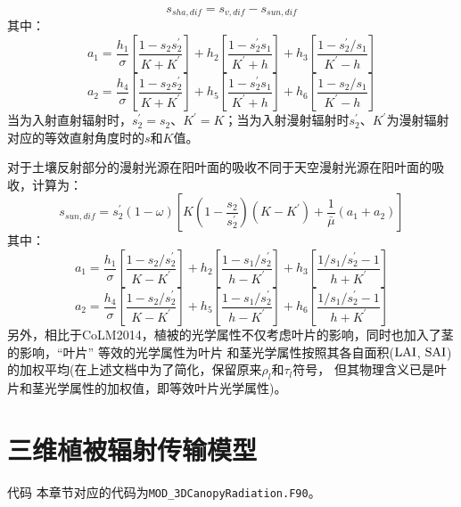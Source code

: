 \begin{equation}
s_{sha,dif}=s_{v,dif}-s_{sun,dif}
\end{equation}
其中：
\begin{equation}
a_{1}=\frac{h_{1}}{\sigma}\left[\frac{1-s_{2} s_{2}^{\prime}}{K+K^{\prime}}\right]+h_{2}\left[\frac{1-s_{2}^{\prime} 
s_{1}}{K^{\prime}+h}\right]+h_{3}\left[\frac{1-s_{2}^{\prime} / s_{1}}{K^{\prime}-h}\right]
\end{equation}
\begin{equation}
a_{2}=\frac{h_{4}}{\sigma}\left[\frac{1-s_{2} s_{2}^{\prime}}{K+K^{\prime}}\right]+h_{5}\left[\frac{1-s_{2}^{\prime} s_{1}}
{K^{\prime}+h}\right]+h_{6}\left[\frac{1-s_{2} / s_{1}}{K^{\prime}-h}\right]
\end{equation}
当为入射直射辐射时，$s_2^\prime=s_2$、$K^\prime=K$；当为入射漫射辐射时$s_2^\prime$、$K^\prime$为漫射辐射对应的等效直射角度时的$s$和$K$值。


对于土壤反射部分的漫射光源在阳叶面的吸收不同于天空漫射光源在阳叶面的吸收，计算为：
\begin{equation}
s_{s u n, dif}=s_{2}^{\prime}(1-\omega)\left[K\left(1-\frac{s_{2}}{s_{2}^{\prime}}\right)
\left(K-K^{\prime}\right)+\frac{1}{\bar{\mu}}\left(a_{1}+a_{2}\right)\right]
\end{equation}
其中：
\begin{equation}
a_{1}=\frac{h_{1}}{\sigma}\left[\frac{1-s_{2} / s_{2}^{\prime}}{K-K^{\prime}}\right]+h_{2}\left[\frac{1-s_{1} /
 s_{2}^{\prime}}{h-K^{\prime}}\right]+h_{3}\left[\frac{1 / s_{1} / s_{2}^{\prime}-1}{h+K^{\prime}}\right]
\end{equation}
\begin{equation}
a_{2}=\frac{h_{4}}{\sigma}\left[\frac{1-s_{2} / s_{2}^{\prime}}{K-K^{\prime}}\right]+h_{5}\left[\frac{1-s_{1} / 
s_{2}^{\prime}}{h-K^{\prime}}\right]+h_{6}\left[\frac{1 / s_{1} / s_{2}^{\prime}-1}{h+K^{\prime}}\right]
\end{equation}
另外，相比于CoLM2014，植被的光学属性不仅考虑叶片的影响，同时也加入了茎的影响，``叶片'' 等效的光学属性为叶片
和茎光学属性按照其各自面积($\rm LAI$, $\rm SAI$)的加权平均(在上述文档中为了简化，保留原来$\rho_l$和$\tau_l$符号，
但其物理含义已是叶片和茎光学属性的加权值，即等效叶片光学属性)。


\section{三维植被辐射传输模型}\label{三维植被辐射传输模型}
\begin{mymdframed}{代码}
本章节对应的代码为\texttt{MOD\_3DCanopyRadiation.F90}。
\end{mymdframed}

